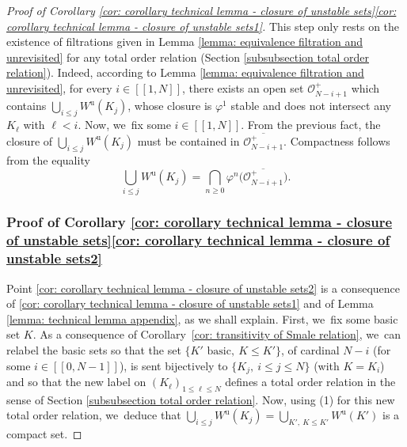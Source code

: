\documentclass[JEP,XML,SOM,Unicode,NoEqCountersInSection,NoFloatCountersInSection,published]{cedram}
\newcommand{\lcr}{[\![}
\newcommand{\rcr}{]\!]}
\newcommand{\ru}{\mathrm{u}}
\theoremstyle{definition}
\theoremstyle{plain}
\newcommand{\Ocal}{\mathcal{O}}
\begin{document}
\begin{appendix}
\begin{proof}[Proof of Corollary \ref{cor: corollary technical lemma - closure of unstable sets}\eqref{cor: corollary technical lemma - closure of unstable sets1}]
This step only rests on the existence of filtrations given in Lemma \ref{lemma: equivalence filtration and unrevisited} for any total order relation (Section \ref{subsubsection total order relation}). Indeed, according to Lemma \ref{lemma: equivalence filtration and unrevisited}, for every $i\in\lcr1,N\rcr$, there exists an open set $\Ocal_{N-i + 1}^+$ which contains $\bigcup_{i \leq j} W^\ru (K_j)$, whose closure is $\varphi^1$ stable and does not intersect any $K_\ell$ with $\ell < i$. Now, we~fix some $i\in\lcr1,N\rcr$. From the previous fact, the closure of $\bigcup_{i \leq j} W^\ru (K_j)$ must be contained in $\overline{\Ocal_{N-i + 1}^+}$. Compactness follows from the equality
\[
\bigcup_{i \leq j} W^\ru (K_j) = \bigcap_{n \geq 0} \varphi^n \bigl(\overline{\Ocal_{N-i+1}^+} \bigr).
\]

\subsubsection*{Proof of Corollary \ref{cor: corollary technical lemma - closure of unstable sets}\eqref{cor: corollary technical lemma - closure of unstable sets2}} Point \eqref{cor: corollary technical lemma - closure of unstable sets2} is a consequence of \eqref{cor: corollary technical lemma - closure of unstable sets1} and of Lemma \ref{lemma: technical lemma appendix}, as we shall explain. First, we~fix some basic set $K$. As a consequence of Corollary~\ref{cor: transitivity of Smale relation}, we~can relabel the basic sets so that the set $\{K' \text{ basic}, \: K \leq K' \}$, of cardinal $N-i$ (for some $i\in\lcr0,N-1\rcr$), is sent bijectively to $\{K_j,\: i \leq j \leq N\}$ (with $K = K_i$) and so that the new label on $(K_\ell)_{1 \leq \ell \leq N}$ defines a total order relation in the sense of Section \ref{subsubsection total order relation}. Now, using (1) for this new total order relation, we~deduce that $\bigcup_{i \leq j} W^\ru (K_j) = \bigcup_{K', \: K \leq K'} W^\ru (K')$ is a compact set.


\end{proof}
\end{appendix}
\end{document}
